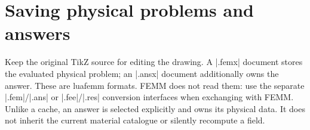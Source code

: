 \section{Saving physical problems and answers}
\label{sec:native-storage}

Keep the original TikZ source for editing the drawing. A |.femx| document stores
the evaluated physical problem; an |.ansx| document additionally owns the answer.
These are \textsf{luafemm} formats. FEMM does not read them: use the separate
|.fem|/|.ans| or |.fee|/|.res| conversion interfaces when exchanging with FEMM.
Unlike a cache, an answer is selected explicitly and owns its physical data.
It does not inherit the current material catalogue or silently recompute a field.

